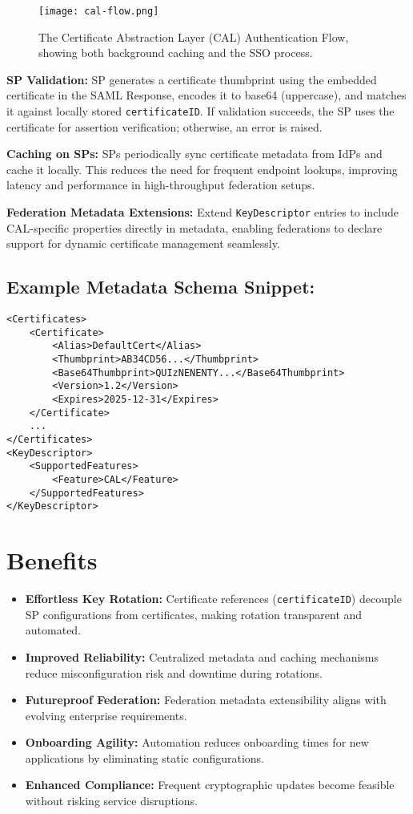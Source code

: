 \documentclass{article}
\begin{document}
\begin{figure}[h!] %
    \centering %
    \texttt{[image: cal-flow.png]}
    \caption{The Certificate Abstraction Layer (CAL) Authentication Flow, showing both background caching and the SSO process.}
    \label{fig:cal-flow}
\end{figure}

\textbf{SP Validation:}  
SP generates a certificate thumbprint using the embedded certificate in the SAML Response, encodes it to base64 (uppercase), and matches it against locally stored \texttt{certificateID}. If validation succeeds, the SP uses the certificate for assertion verification; otherwise, an error is raised.

\textbf{Caching on SPs:}  
SPs periodically sync certificate metadata from IdPs and cache it locally. This reduces the need for frequent endpoint lookups, improving latency and performance in high-throughput federation setups.

\textbf{Federation Metadata Extensions:}  
Extend \texttt{KeyDescriptor} entries to include CAL-specific properties directly in metadata, enabling federations to declare support for dynamic certificate management seamlessly.

\subsection*{Example Metadata Schema Snippet:}
\begin{verbatim}
<Certificates>
    <Certificate>
        <Alias>DefaultCert</Alias>
        <Thumbprint>AB34CD56...</Thumbprint>
        <Base64Thumbprint>QUIzNENENTY...</Base64Thumbprint>
        <Version>1.2</Version>
        <Expires>2025-12-31</Expires>
    </Certificate>
    ...
</Certificates>
<KeyDescriptor>
    <SupportedFeatures>
        <Feature>CAL</Feature>
    </SupportedFeatures>
</KeyDescriptor>
\end{verbatim}

\section*{Benefits}
\begin{itemize}
    \item \textbf{Effortless Key Rotation:} Certificate references (\texttt{certificateID}) decouple SP configurations from certificates, making rotation transparent and automated.
    \item \textbf{Improved Reliability:} Centralized metadata and caching mechanisms reduce misconfiguration risk and downtime during rotations.
    \item \textbf{Futureproof Federation:} Federation metadata extensibility aligns with evolving enterprise requirements.
    \item \textbf{Onboarding Agility:} Automation reduces onboarding times for new applications by eliminating static configurations.
    \item \textbf{Enhanced Compliance:} Frequent cryptographic updates become feasible without risking service disruptions.
\end{itemize}
\end{document}
